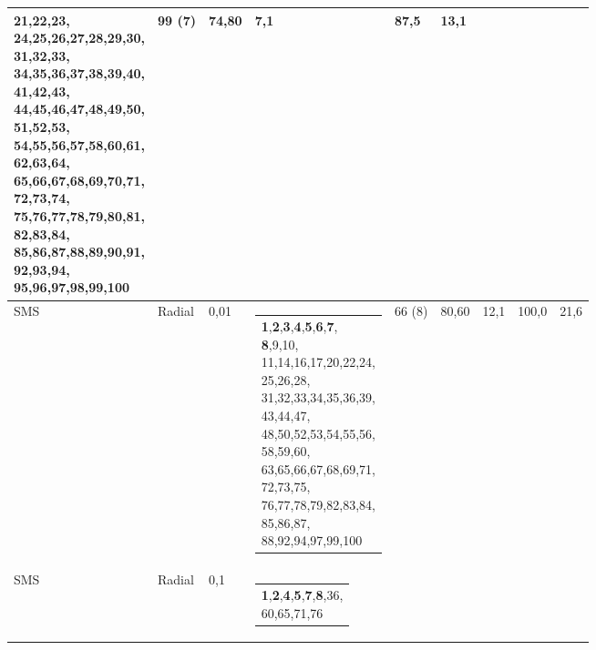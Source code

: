 \documentclass[12pt,a4paper]{article}
\makeatletter
\newcommand{\makecell}[2][t]{\begin{tabular}[#1]{@{}l@{}}#2\end{tabular}}
\newcommand{\novo}[1]{\textcolor{corNova}{#1}}
\makeatother
\begin{document}
\begin{longtable}{L{1.3cm}|L{1.3cm}|C{0.8cm}|L{4.8cm}|C{1.55cm}|C{0.95cm}|C{0.95cm}|C{0.9cm}|C{1.05cm}}
{{               21,22,23,\\
               24,25,26,27,28,29,30,\\
               31,32,33,\\
               34,35,36,37,38,39,40,\\
               41,42,43,\\
               44,45,46,47,48,49,50,\\
               51,52,53,\\
               54,55,56,57,58,60,61,\\
               62,63,64,\\
               65,66,67,68,69,70,71,\\
               72,73,74,\\
               75,76,77,78,79,80,81,\\
               82,83,84,\\
               85,86,87,88,89,90,91,\\
               92,93,94,\\
               95,96,97,98,99,100}} &
  \novo{99 (7)} & \novo{74,80} & \novo{7,1} & \novo{87,5} & \novo{13,1} \\
\hline
\novo{SMS} & \novo{Radial} & \novo{0,01} &
  \novo{\makecell[l]{\textbf{1},\textbf{2},\textbf{3},\textbf{4},\textbf{5},\textbf{6},\textbf{7},\\
               \textbf{8},9,10,\\
               11,14,16,17,20,22,24,\\
               25,26,28,\\
               31,32,33,34,35,36,39,\\
               43,44,47,\\
               48,50,52,53,54,55,56,\\
               58,59,60,\\
               63,65,66,67,68,69,71,\\
               72,73,75,\\
               76,77,78,79,82,83,84,\\
               85,86,87,\\
               88,92,94,97,99,100}} &
  \novo{66 (8)} & \novo{80,60} & \novo{12,1} & \novo{100,0} & \novo{21,6} \\
\hline
\novo{SMS} & \novo{Radial} & \novo{0,1} &
  \novo{\makecell[l]{\textbf{1},\textbf{2},\textbf{4},\textbf{5},\textbf{7},\textbf{8},36,\\
               60,65,71,76}} &

\end{longtable}
\end{document}

